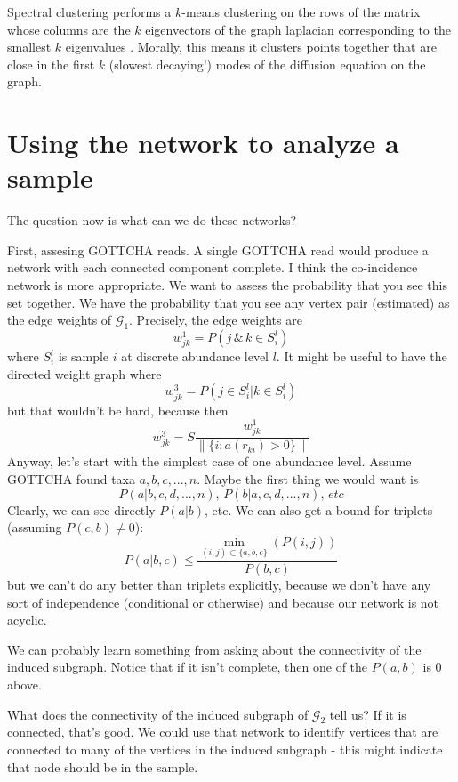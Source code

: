 \documentclass[10pt]{article}
\theoremstyle{definition}
\numberwithin{theorem}{section}
\numberwithin{definition}{section}
\numberwithin{lemma}{section}
\numberwithin{corollary}{section}
\numberwithin{clm}{section}
\numberwithin{rmk}{section}
\newcommand{\cG}{\mathcal{G}}
\begin{document}
Spectral clustering performs a $k$-means clustering on the rows of the matrix whose columns are the $k$ eigenvectors of the graph laplacian corresponding to the smallest $k$ eigenvalues \cite{vonLuxburg2007} . Morally, this means it clusters points together that are close in the first $k$ (slowest decaying!) modes of the diffusion equation on the graph.
\section{Using the network to analyze a sample}

The question now is what can we do these networks?

First, assesing GOTTCHA reads. A single GOTTCHA read would produce a network with each connected component complete. I think the co-incidence network is more appropriate. We want to assess the probability that you see this set together. We have the probability that you see any vertex pair (estimated) as the edge weights of $\cG_1$. Precisely, the edge weights are
\[
w^1_{jk} = P(j \, \&\, k \in  S_i^l)
\]
where $S_i^l$ is sample $i$ at discrete abundance level $l$. It might be useful to have the directed weight graph where
\[
w^3_{jk} = P(j \in S_i^l | k \in S_i^l)
\]
but that wouldn't be hard, because then
\[
w^3_{jk} = S\frac{w^1_{jk}}{\|\{i:a(r_{ki})>0\}\|} 
\]
Anyway, let's start with the simplest case of one abundance level. Assume GOTTCHA found taxa $a,b,c,...,n$. Maybe the first thing we would want is
\[
P(a | b,c,d,...,n), \, P(b|a,c,d,...,n) ,\, \mathit{etc}
\]
Clearly, we can see directly $P(a|b)$, etc. We can also get a bound for triplets (assuming $P(c,b) \neq 0$):
\[
P(a|b,c) \leq \frac{\min_{(i,j) \subset \{a,b,c\}}(P(i,j))}{P(b,c)}
\]
but we can't do any better than triplets explicitly, because we don't have any sort of independence (conditional or otherwise) and because our network is not acyclic. 

We can probably learn something from asking about the connectivity of the induced subgraph. Notice that if it isn't complete, then one of the $P(a,b)$ is $0$ above. 

What does the connectivity of the induced subgraph of $\cG_2$ tell us? If it is connected, that's good.  We could use that network to identify vertices that are connected to many of the vertices in the induced subgraph - this might indicate that node should be in the sample.
\end{document}
